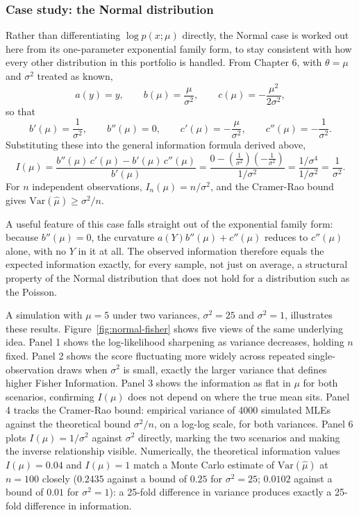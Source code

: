 \documentclass[12pt,a4paper]{report}
\begin{document}
\subsubsection*{Case study: the Normal distribution}

Rather than differentiating $\log p(x;\mu)$ directly, the Normal case is worked out here from its one-parameter exponential family form, to stay consistent with how every other distribution in this portfolio is handled. From Chapter 6, with $\theta = \mu$ and $\sigma^2$ treated as known,
\[
a(y) = y, \qquad b(\mu) = \frac{\mu}{\sigma^2}, \qquad c(\mu) = -\frac{\mu^2}{2\sigma^2},
\]
so that
\[
b'(\mu) = \frac{1}{\sigma^2}, \qquad b''(\mu) = 0, \qquad c'(\mu) = -\frac{\mu}{\sigma^2}, \qquad c''(\mu) = -\frac{1}{\sigma^2}.
\]
Substituting these into the general information formula derived above,
\[
I(\mu) = \frac{b''(\mu)\,c'(\mu) - b'(\mu)\,c''(\mu)}{b'(\mu)}
= \frac{0 - \left(\tfrac{1}{\sigma^2}\right)\left(-\tfrac{1}{\sigma^2}\right)}{1/\sigma^2}
= \frac{1/\sigma^4}{1/\sigma^2} = \frac{1}{\sigma^2}.
\]
For $n$ independent observations, $I_n(\mu) = n/\sigma^2$, and the Cramer-Rao bound gives $\text{Var}(\hat\mu) \geq \sigma^2/n$.

A useful feature of this case falls straight out of the exponential family form: because $b''(\mu) = 0$, the curvature $a(Y)b''(\mu) + c''(\mu)$ reduces to $c''(\mu)$ alone, with no $Y$ in it at all. The observed information therefore equals the expected information exactly, for every sample, not just on average, a structural property of the Normal distribution that does not hold for a distribution such as the Poisson.

A simulation with $\mu = 5$ under two variances, $\sigma^2 = 25$ and $\sigma^2 = 1$, illustrates these results. Figure~\ref{fig:normal-fisher} shows five views of the same underlying idea. Panel 1 shows the log-likelihood sharpening as variance decreases, holding $n$ fixed. Panel 2 shows the score fluctuating more widely across repeated single-observation draws when $\sigma^2$ is small, exactly the larger variance that defines higher Fisher Information. Panel 3 shows the information as flat in $\mu$ for both scenarios, confirming $I(\mu)$ does not depend on where the true mean sits. Panel 4 tracks the Cramer-Rao bound: empirical variance of 4000 simulated MLEs against the theoretical bound $\sigma^2/n$, on a log-log scale, for both variances. Panel 6 plots $I(\mu) = 1/\sigma^2$ against $\sigma^2$ directly, marking the two scenarios and making the inverse relationship visible. Numerically, the theoretical information values $I(\mu) = 0.04$ and $I(\mu) = 1$ match a Monte Carlo estimate of $\text{Var}(\hat\mu)$ at $n=100$ closely ($0.2435$ against a bound of $0.25$ for $\sigma^2=25$; $0.0102$ against a bound of $0.01$ for $\sigma^2=1$): a 25-fold difference in variance produces exactly a 25-fold difference in information.
\end{document}
